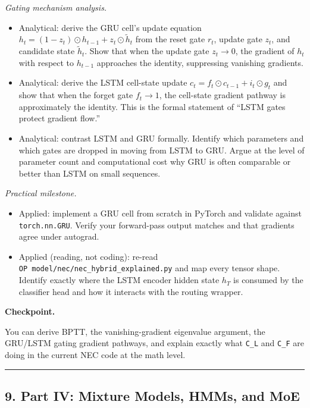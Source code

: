 \emph{Gating mechanism analysis.}

\begin{itemize}
\tightlist
\item
  Analytical: derive the GRU cell's update equation
  \(h_t = (1 - z_t) \odot h_{t-1} + z_t \odot \tilde{h}_t\) from the
  reset gate \(r_t\), update gate \(z_t\), and candidate state
  \(\tilde{h}_t\). Show that when the update gate \(z_t \to 0\), the
  gradient of \(h_t\) with respect to \(h_{t-1}\) approaches the
  identity, suppressing vanishing gradients.
\item
  Analytical: derive the LSTM cell-state update
  \(c_t = f_t \odot c_{t-1} + i_t \odot g_t\) and show that when the
  forget gate \(f_t \to 1\), the cell-state gradient pathway is
  approximately the identity. This is the formal statement of ``LSTM
  gates protect gradient flow.''
\item
  Analytical: contrast LSTM and GRU formally. Identify which parameters
  and which gates are dropped in moving from LSTM to GRU. Argue at the
  level of parameter count and computational cost why GRU is often
  comparable or better than LSTM on small sequences.
\end{itemize}

\emph{Practical milestone.}

\begin{itemize}
\tightlist
\item
  Applied: implement a GRU cell from scratch in PyTorch and validate
  against \texttt{torch.nn.GRU}. Verify your forward-pass output matches
  and that gradients agree under autograd.
\item
  Applied (reading, not coding): re-read
  \texttt{OP\ model/nec/nec\_hybrid\_explained.py} and map every tensor
  shape. Identify exactly where the LSTM encoder hidden state \(h_T\) is
  consumed by the classifier head and how it interacts with the routing
  wrapper.
\end{itemize}

\textbf{Checkpoint.}

You can derive BPTT, the vanishing-gradient eigenvalue argument, the
GRU/LSTM gating gradient pathways, and explain exactly what
\texttt{C\_L} and \texttt{C\_F} are doing in the current NEC code at the
math level.

\begin{center}\rule{0.5\linewidth}{0.5pt}\end{center}

\subsection{9. Part IV: Mixture Models, HMMs, and
MoE}\label{part-iv-mixture-models-hmms-and-moe}

